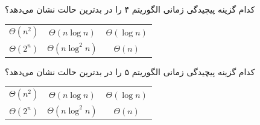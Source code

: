  کدام گزینه پیچیدگی زمانی الگوریتم ۴
را در بدترین حالت نشان می‌دهد؟

\begin{large}
	\begin{center}
		\begin{tabular}{c c c}
			$\Theta(n^2)$ & $\Theta(n \log n)$ & $\Theta(\log n)$\\
			$\Theta(2^n)$ &	$\Theta(n\log^2 n)$ & $\Theta(n)$\\
		\end{tabular}
	\end{center}
\end{large}

%
%
%
%
%
%
%


 کدام گزینه پیچیدگی زمانی الگوریتم ۵
را در بدترین حالت نشان می‌دهد؟
\begin{large}
	\begin{center}
		\begin{tabular}{c c c}
			$\Theta(n^2)$ & $\Theta(n \log n)$ & $\Theta(\log n)$\\
			$\Theta(2^n)$ &	$\Theta(n\log^2 n)$ & $\Theta(n)$\\
		\end{tabular}
	\end{center}
\end{large}
%
%
%
%
%
%
%










